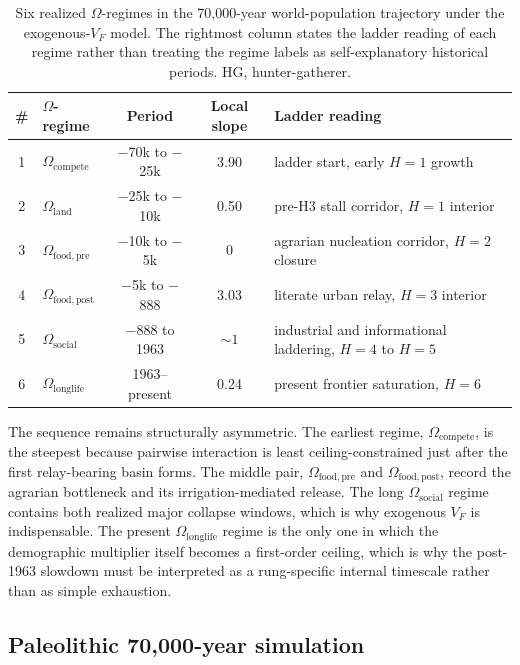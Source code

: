 \documentclass[11pt]{article}
\begin{document}
\begin{table}[htbp]
\centering
\caption{
Six realized \(\Omega\)-regimes in the 70,000-year world-population trajectory under the exogenous-\(V_F\) model.
The rightmost column states the ladder reading of each regime rather than treating the regime labels as self-explanatory historical periods.
HG, hunter-gatherer.
}
\label{tab:segments}
\begin{tabular}{clccl}
\toprule
\# & \(\Omega\)-regime & Period & Local slope & Ladder reading \\
\midrule
1 & \(\Omega_{\mathrm{compete}}\)   & \(-\)70k to \(-\)25k & 3.90 & ladder start, early \(H{=}1\) growth \\
2 & \(\Omega_{\mathrm{land}}\)      & \(-\)25k to \(-\)10k & 0.50 & pre-H3 stall corridor, \(H{=}1\) interior \\
3 & \(\Omega_{\mathrm{food,pre}}\)  & \(-\)10k to \(-\)5k  & 0    & agrarian nucleation corridor, \(H{=}2\) closure \\
4 & \(\Omega_{\mathrm{food,post}}\) & \(-\)5k to \(-\)888  & 3.03 & literate urban relay, \(H{=}3\) interior \\
5 & \(\Omega_{\mathrm{social}}\)    & \(-\)888 to 1963      & \(\sim\!1\) & industrial and informational laddering, \(H{=}4\) to \(H{=}5\) \\
6 & \(\Omega_{\mathrm{longlife}}\)  & 1963--present          & 0.24 & present frontier saturation, \(H{=}6\) \\
\bottomrule
\end{tabular}
\end{table}

The sequence remains structurally asymmetric.
The earliest regime,
\(\Omega_{\mathrm{compete}}\),
is the steepest because pairwise interaction is least ceiling-constrained just after the first relay-bearing basin forms.
The middle pair,
\(\Omega_{\mathrm{food,pre}}\) and
\(\Omega_{\mathrm{food,post}}\),
record the agrarian bottleneck and its irrigation-mediated release.
The long
\(\Omega_{\mathrm{social}}\) regime contains both realized major collapse windows,
which is why exogenous
\(V_F\)
is indispensable.
The present
\(\Omega_{\mathrm{longlife}}\) regime is the only one in which the demographic multiplier itself becomes a first-order ceiling,
which is why the post-1963 slowdown must be interpreted as a rung-specific internal timescale rather than as simple exhaustion.

\subsection{Paleolithic 70,000-year simulation}\label{sec:paleo-70ky}
\end{document}
